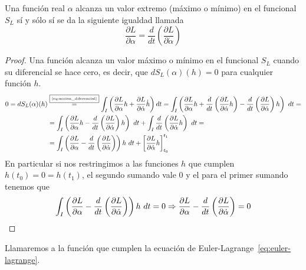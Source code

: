 \begin{theorem}
	Una función real $\alpha$ alcanza un valor extremo (máximo o mínimo) en el funcional $S_L$ sí y sólo sí se da la siguiente igualdad llamada 
	\begin{equation}
		\label{eq:euler-lagrange}
		\frac{\partial L}{\partial \alpha}=\frac{d}{dt}\left( \frac{\partial L}{\partial \dot{\alpha}} \right)
	\end{equation}
\end{theorem}
\begin{proof}
	Una función alcanza un valor máximo o mínimo en el funcional $S_L$ cuando su diferencial se hace cero, es decir, que $dS_L(\alpha)(h)=0$ para cualquier función $h$.
	\begin{equation*}
		\begin{split}
			0 = dS_L(\alpha)(h) &\overset{\fbox{\tiny \ref{eq:accion_diferencial}}}{=}\int_{I}\left( \frac{\partial L}{\partial\alpha}h+\frac{\partial L}{\partial\dot{\alpha}}\dot{h}\right) dt = \int_{I}\left( \frac{\partial L}{\partial\alpha}h+\frac{d}{dt}\left( \frac{\partial L}{\partial \dot{\alpha}}h \right)-\frac{d}{dt}\left( \frac{\partial L}{\partial \dot{\alpha}} \right)h\right)\ dt = \\
			& = \int_{I}\left( \frac{\partial L}{\partial \alpha}h-\frac{d}{dt}\left( \frac{\partial L}{\partial \dot{\alpha}} \right)h\right)\ dt +\int_{I}\frac{d}{dt}\left( \frac{\partial L}{\partial \dot{\alpha}}h \right)\ dt = \\
			& =\int_I\left( \frac{\partial L}{\partial \alpha}-\frac{d}{dt}\left( \frac{\partial L}{\partial \dot{\alpha}} \right)\right)h\ dt + \left[ \frac{\partial L}{\partial \dot{\alpha}}h \right]_{t_0}^{t_1}
		\end{split}
	\end{equation*}
	En particular si nos restringimos a las funciones $h$ que cumplen $h(t_0)=0=h(t_1)$, el segundo sumando vale $0$ y el para el primer sumando tenemos que
	\begin{equation*}
		\int_{I}\left( \frac{\partial L}{\partial \alpha}-\frac{d}{dt}\left( \frac{\partial L}{\partial \dot{\alpha}} \right)\right)h\ dt = 0 \Rightarrow \frac{\partial L}{\partial \alpha}-\frac{d}{dt}\left( \frac{\partial L}{\partial \dot{\alpha}} \right) = 0
	\end{equation*}
\end{proof}

\begin{definition}
	Llamaremos   a la función que cumplen la ecuación de Euler-Lagrange~\eqref{eq:euler-lagrange}.
\end{definition}


